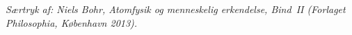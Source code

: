 \documentclass[12pt,a4paper]{article}
\begin{document}
\thispagestyle{fancy}
{\footnotesize\itshape Særtryk af: Niels Bohr, \emph{Atomfysik og menneskelig erkendelse}, Bind~II
 (Forlaget Philosophia, K\o{}benhavn 2013).\par}
\medskip


\end{document}
